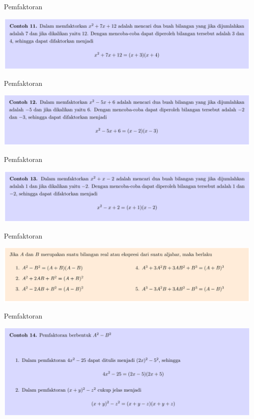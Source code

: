 \documentclass[pdflatex,compress,mathserif]{beamer}
\begin{document}
\begin{frame}{Pemfaktoran}
	\begin{center}
		\includegraphics[width=\linewidth]{img/img26}
	\end{center}
\end{frame}

\begin{frame}{Pemfaktoran}
	\begin{center}
		\includegraphics[width=\linewidth]{img/img27}
	\end{center}
\end{frame}

\begin{frame}{Pemfaktoran}
	\begin{center}
		\includegraphics[width=\linewidth]{img/img28}
	\end{center}
\end{frame}

\begin{frame}{Pemfaktoran}
	\begin{center}
		\includegraphics[width=\linewidth]{img/img29}
	\end{center}
\end{frame}

\begin{frame}{Pemfaktoran}
	\begin{center}
		\includegraphics[width=\linewidth]{img/img30}
	\end{center}
\end{frame}
\end{document}
